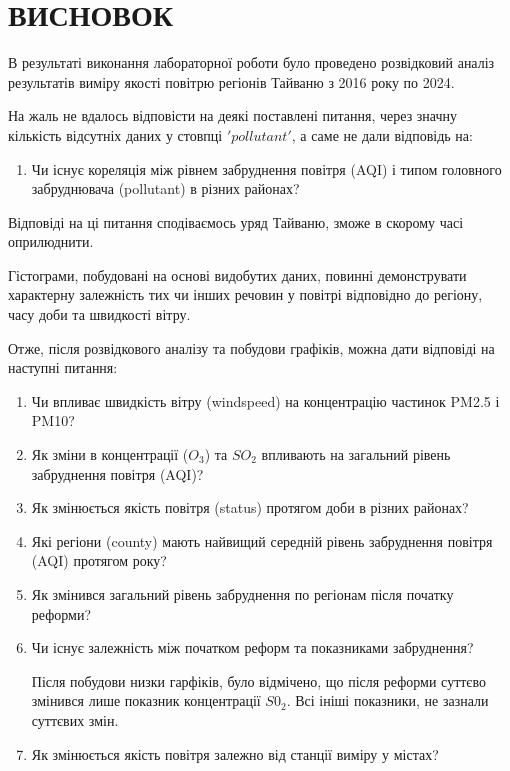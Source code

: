 \documentclass{article}
\begin{document}
\begin{enumerate}
\end{enumerate}

\pagebreak

\newpage
\section{ВИСНОВОК}
В результаті виконання лабораторної роботи було проведено розвідковий аналіз результатів виміру якості повітрю регіонів Тайваню з 2016 року по 2024. 

На жаль не вдалось відповісти на деякі поставлені питання, через значну кількість відсутніх даних у стовпці $'pollutant'$, а саме не дали відповідь на: 
\begin{enumerate}
    
    \item  Чи існує кореляція між рівнем забруднення повітря (AQI) і типом головного забруднювача (pollutant) в різних районах?
    
\end{enumerate}
Відповіді на ці питання сподіваємось уряд Тайваню, зможе в скорому часі оприлюднити.




Гістограми, побудовані на основі видобутих даних, повинні демонструвати характерну залежність тих чи інших речовин у повітрі відповідно до регіону, часу доби та швидкості вітру.

Отже, після розвідкового аналізу та побудови графіків, можна дати відповіді на наступні питання:
\begin{enumerate}
    \item Чи впливає швидкість вітру (windspeed) на концентрацію частинок PM2.5 і PM10?
    
    \item Як зміни в концентрації  ($O_3$)  та $SO_2$ впливають на загальний рівень забруднення повітря (AQI)?
    
    \item Як змінюється якість повітря (status) протягом доби в різних районах?
    
    \item Які регіони (county) мають найвищий середній рівень забруднення повітря (AQI) протягом року?
     
    \item Як змінився загальний рівень забруднення по регіонам після початку реформи?
    
    \item Чи існує залежність між початком реформ та показниками забруднення?
    
    Після побудови низки гарфіків, було відмічено, що після реформи суттєво змінився лише показник концентрації $S0_2$. Всі ініші показники, не зазнали суттєвих змін.
    
    \item Як змінюється якість повітря залежно від станції виміру у містах?
    
\end{enumerate}
\end{document}
